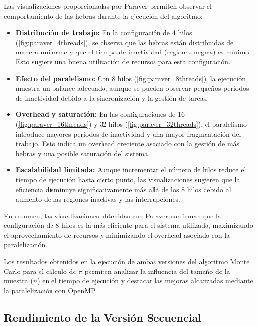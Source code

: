 \documentclass[a4paper, 10pt, onecolumn]{IEEEtran}
\begin{document}
Las visualizaciones proporcionadas por Paraver permiten observar el comportamiento de las hebras durante la ejecución del algoritmo:

\begin{itemize}
  \item \textbf{Distribución de trabajo:} En la configuración de 4 hilos (\cref{fig:paraver_4threads}), se observa que las hebras están distribuidas de manera uniforme y que el tiempo de inactividad (regiones negras) es mínimo. Esto sugiere una buena utilización de recursos para esta configuración.
  
  \item \textbf{Efecto del paralelismo:} Con 8 hilos (\cref{fig:paraver_8threads}), la ejecución muestra un balance adecuado, aunque se pueden observar pequeños periodos de inactividad debido a la sincronización y la gestión de tareas.
  
  \item \textbf{Overhead y saturación:} En las configuraciones de 16 (\cref{fig:paraver_16threads}) y 32 hilos (\cref{fig:paraver_32threads}), el paralelismo introduce mayores periodos de inactividad y una mayor fragmentación del trabajo. Esto indica un overhead creciente asociado con la gestión de más hebras y una posible saturación del sistema.
  
  \item \textbf{Escalabilidad limitada:} Aunque incrementar el número de hilos reduce el tiempo de ejecución hasta cierto punto, las visualizaciones sugieren que la eficiencia disminuye significativamente más allá de los 8 hilos debido al aumento de las regiones inactivas y las interrupciones.
\end{itemize}

En resumen, las visualizaciones obtenidas con Paraver confirman que la configuración de 8 hilos es la más eficiente para el sistema utilizado, maximizando el aprovechamiento de recursos y minimizando el overhead asociado con la paralelización.

Los resultados obtenidos en la ejecución de ambas versiones del algoritmo Monte Carlo para el cálculo de $\pi$ permiten analizar la influencia del tamaño de la muestra ($n$) en el tiempo de ejecución y destacar las mejoras alcanzadas mediante la paralelización con OpenMP.

\subsection{Rendimiento de la Versión Secuencial}
\end{document}

